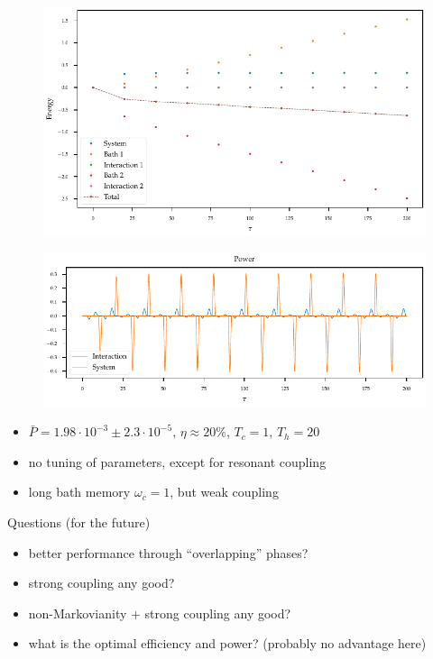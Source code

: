 \documentclass[10pt, aspectratio=169]{beamer}
\begin{document}
\begin{frame}
  \begin{figure}[h]
    \centering
    \includegraphics{figs/otto/energy_strobe}
  \end{figure}
\end{frame}
\begin{frame}
  \begin{figure}[h]
    \centering
    \includegraphics{figs/otto/power}
  \end{figure}
  \begin{itemize}
  \item \(\bar{P} = 1.98 \cdot 10^{-3} \pm 2.3 \cdot 10^{-5}\),
    \(η\approx 20\%\), \(T_{c}=1\), \(T_{h}=20\)
  \item no tuning of parameters, except for resonant coupling
  \item long bath memory \(ω_{c}=1\), but weak coupling
  \end{itemize}
\end{frame}
\begin{frame}{Questions (for the future)}
  \begin{itemize}
  \item better performance through ``overlapping'' phases?
  \item strong coupling any good?
  \item non-Markovianity + strong coupling any good?
  \item what is the optimal efficiency and power? (probably no
    advantage here)
  \end{itemize}
\end{frame}
\end{document}
